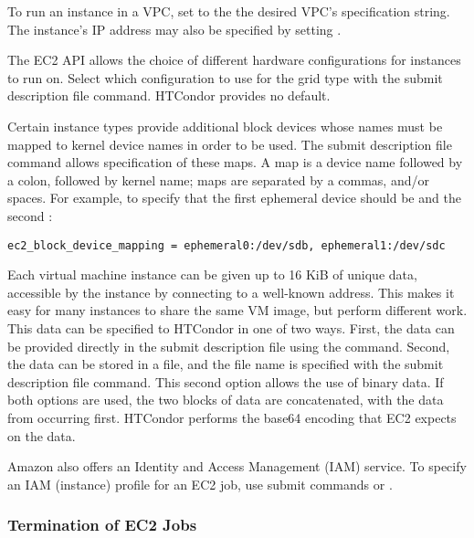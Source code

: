 To run an instance in a VPC, 
set  to the the desired VPC's specification string.
The instance's IP address 
may also be specified by setting .

The EC2 API allows the choice of different hardware configurations 
for instances to run on.
Select which configuration to use for the  grid type
with the  submit description file command.
HTCondor provides no default.

Certain instance types provide additional block devices whose names must be
mapped to kernel device names in order to be used.
The  submit description file command
allows specification of these maps.  
A map is a device name followed by a
colon, followed by kernel name; 
maps are separated by a commas, and/or spaces.
For example, 
to specify that the first ephemeral device should be 
and the second :

\begin{verbatim}
ec2_block_device_mapping = ephemeral0:/dev/sdb, ephemeral1:/dev/sdc
\end{verbatim}

Each virtual machine instance can be given up to 16 KiB of unique data, 
accessible by the instance by connecting to a well-known address.
This makes it easy for many instances to share the same VM image,
but perform different work.
This data can be specified to HTCondor in one of two ways.
First, the data can be provided directly in the submit description file 
using the  command.
Second, the data can be
stored in a file, and the file name is specified with the
 submit description file command.
This second option allows the use of binary data.
If both options are used, the two blocks of
data are concatenated, with the data from  
occurring first.  HTCondor performs the base64 encoding that EC2 expects on 
the data.

Amazon also offers an Identity and Access Management (IAM) service.
To specify an IAM (instance) profile for an EC2 job, 
use submit commands
 or .

\subsubsection{\label{sec:EC2-termination}Termination of EC2 Jobs}

